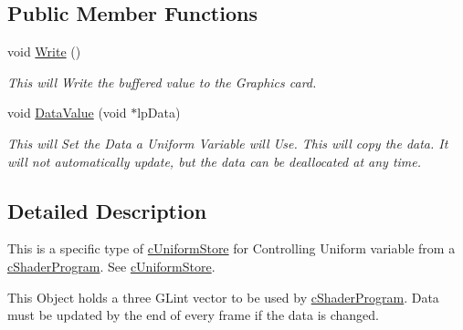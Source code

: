 \subsection*{Public Member Functions}
\begin{DoxyCompactItemize}
\item 
\hypertarget{classc_uniform_int_vector3_adf6a41b1b33887f1dfcd19807f981627}{
void \hyperlink{classc_uniform_int_vector3_adf6a41b1b33887f1dfcd19807f981627}{Write} ()}
\label{classc_uniform_int_vector3_adf6a41b1b33887f1dfcd19807f981627}

\begin{DoxyCompactList}\small\item\em This will Write the buffered value to the Graphics card. \end{DoxyCompactList}\item 
\hypertarget{classc_uniform_int_vector3_a6732986e4061d421c028d908070707cc}{
void \hyperlink{classc_uniform_int_vector3_a6732986e4061d421c028d908070707cc}{DataValue} (void $\ast$lpData)}
\label{classc_uniform_int_vector3_a6732986e4061d421c028d908070707cc}

\begin{DoxyCompactList}\small\item\em This will Set the Data a Uniform Variable will Use. This will copy the data. It will not automatically update, but the data can be deallocated at any time. \end{DoxyCompactList}\end{DoxyCompactItemize}


\subsection{Detailed Description}
This is a specific type of \hyperlink{classc_uniform_store}{cUniformStore} for Controlling Uniform variable from a \hyperlink{classc_shader_program}{cShaderProgram}. See \hyperlink{classc_uniform_store}{cUniformStore}. 

This Object holds a three GLint vector to be used by \hyperlink{classc_shader_program}{cShaderProgram}. Data must be updated by the end of every frame if the data is changed. 